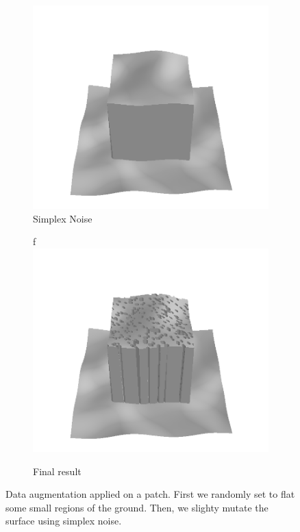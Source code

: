 \documentclass[../document.tex]{subfiles}
\begin{document}
\begin{figure}[htbp]
          \begin{subfigure}[b]{0.32\textwidth}
            \includegraphics[width=\textwidth]{../img/data-aug/3d/center-simplex-mayavi.png}
            \caption{Simplex Noise}

        \end{subfigure}    
        \begin{subfigure}[b]{0.32\textwidth}f
            \includegraphics[width=\textwidth]{../img/data-aug/3d/center-final-mayavi.png}
            \caption{Final result}
        \end{subfigure}    
    \label{fig: data-aug}
    \caption{Data augmentation applied on a patch. First we randomly set to flat some small regions of the ground. Then, we slighty mutate the surface using simplex noise.}    
\end{figure}
\end{document}
